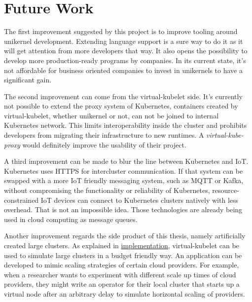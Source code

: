 \section{Future Work}
The first improvement suggested by this project is to improve tooling around unikernel development. Extending language support is a sure way to do it as it will get attention from more developers that way. It also opens the possibility to develop more production-ready programs by companies. In its current state, it's not affordable for business oriented companies to invest in unikernels to have a significant gain.

The second improvement can come from the virtual-kubelet side. It's currently not possible to extend the proxy system of Kubernetes, containers created by virtual-kubelet, whether unikernel or not, can not be joined to internal Kubernetes network. This limits interoperability inside the cluster and prohibits developers from migrating their infrastructure to new runtimes. A \textit{virtual-kube-proxy} would definitely improve the usability of their project.

A third improvement can be made to blur the line between Kubernetes and IoT. Kubernetes uses HTTPS for intercluster communication. If that system can be swapped with a more IoT friendly messaging system, such as MQTT or Kafka, without compromising the functionality or reliability of Kubernetes, resource-constrained IoT devices can connect to Kubernetes clusters natively with less overhead. That is not an impossible idea. Those technologies are already being used in cloud computing as message queues.

Another improvement regards the side product of this thesis, namely artificially created large clusters. As explained in \hyperref[chapter:implementation]{implementation}, virtual-kubelet can be used to simulate large clusters in a budget friendly way. An application can be developed to mimic scaling strategies of certain cloud providers. For example, when a researcher wants to experiment with different scale up times of cloud providers, they might write an operator for their local cluster that starts up a virtual node after an arbitrary delay to simulate horizontal scaling of providers.